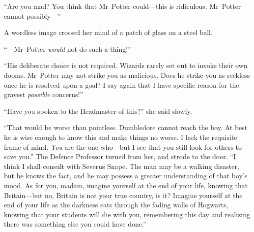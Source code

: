 “Are you mad? You think that Mr~Potter could—this is ridiculous. Mr~Potter cannot possibly—”

A wordless image crossed her mind of a patch of glass on a steel ball.

“—Mr~Potter \emph{would} not do such a thing!”

“His deliberate choice is not required. Wizards rarely set out to invoke their own dooms. Mr~Potter may not strike you as malicious. Does he strike you as reckless once he is resolved upon a goal? I say again that I have specific reason for the gravest \emph{possible} concerns!”

“Have you spoken to the Headmaster of this?” she said slowly.

“That would be worse than pointless. Dumbledore cannot reach the boy. At best he is wise enough to know this and make things no worse. I lack the requisite frame of mind. \emph{You} are the one who—but I see that you still look for others to save you.” The Defence Professor turned from her, and strode to the door. “I think I shall consult with Severus Snape. The man may be a walking disaster, but he knows the fact, and he may possess a greater understanding of that boy’s mood. As for you, madam, imagine yourself at the end of your life, knowing that Britain—but no, Britain is not your true country, is it? Imagine yourself at the end of your life as the darkness eats through the fading walls of Hogwarts, knowing that your students will die with you, remembering this day and realizing there was something else you could have done.”

